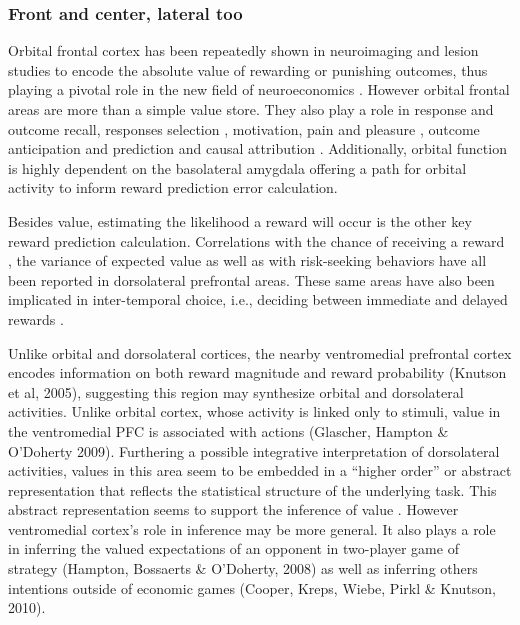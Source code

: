 \documentclass[doc,12pt]{apa}        %
\begin{document}
\subsubsection{Front and center, lateral too}
\label{subsub:fclt}
Orbital frontal cortex has been repeatedly shown in neuroimaging \cite{ODoherty:2001p2423} and lesion \cite{Hornak:2004p6234} studies to encode the absolute value of rewarding or punishing outcomes, thus playing a pivotal role in the new field of neuroeconomics \cite{Glimcher:2005p863}.  However orbital frontal areas are more than a simple value store.  They also play a role in response and outcome recall, responses selection \cite{Rudebeck:2008p4712, Furuyashiki:2008p1631}, motivation, pain and pleasure \cite{Atlas:2010p7566}, outcome anticipation and prediction \cite{Tanaka:2006fk, Roesch:2007p7182} and causal attribution \cite{Tanaka:2008p3265}.  Additionally, orbital function is highly dependent on the basolateral amygdala \cite{ODoherty:2003p2616} offering a path for orbital activity to inform reward prediction error calculation.  

Besides value, estimating the likelihood a reward will occur is the other key reward prediction calculation.  Correlations with the chance of receiving a reward \cite{Tobler:2009p8297}, the variance of expected value \cite{Kahnt:2010p7677} as well as with risk-seeking behaviors \cite{Tobler:2007p1562} have all been reported in dorsolateral prefrontal areas.  These same areas have also been implicated in inter-temporal choice, i.e., deciding between immediate and delayed rewards \cite{Kim:2009p8304,Kim:2008p2984}.

Unlike orbital and dorsolateral cortices, the nearby ventromedial prefrontal cortex encodes information on both reward magnitude and reward probability (Knutson et al, 2005), suggesting this region may synthesize orbital and dorsolateral activities.  Unlike orbital cortex, whose activity is linked only to stimuli, value in the ventromedial PFC is associated with actions (Glascher, Hampton \& O’Doherty 2009).   Furthering a possible integrative interpretation of dorsolateral activities, values in this area seem to be embedded in a ``higher order''  or abstract representation that reflects the statistical structure of the underlying task.  This abstract representation seems to support the inference of value \cite{Hampton:2006p2577}.  However ventromedial cortex's role in inference may be more general. It also plays a role in inferring the valued expectations of an opponent in two-player game of strategy (Hampton, Bossaerts \& O'Doherty, 2008) as well as inferring others intentions outside of economic games (Cooper, Kreps, Wiebe, Pirkl \& Knutson, 2010).
\end{document}

